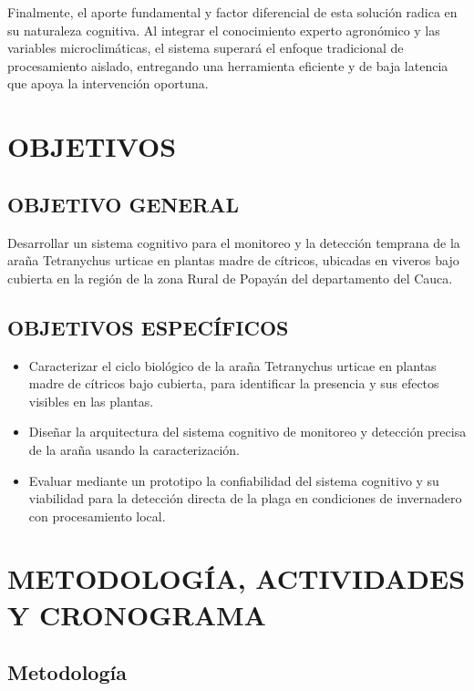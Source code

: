 \documentclass[12pt,letterpaper]{article}
\begin{document}
Finalmente, el aporte fundamental y factor diferencial de esta solución radica en su naturaleza cognitiva. Al integrar el conocimiento experto agronómico y las variables microclimáticas, el sistema superará el enfoque tradicional de procesamiento aislado, entregando una herramienta eficiente y de baja latencia que apoya la intervención oportuna.

\section{OBJETIVOS}

\subsection{OBJETIVO GENERAL}

Desarrollar un sistema cognitivo para el monitoreo y la detección temprana de la araña Tetranychus urticae en plantas madre de cítricos, ubicadas en viveros bajo cubierta en la región de la zona Rural de Popayán del 
departamento del Cauca. 

\subsection{OBJETIVOS ESPECÍFICOS}

\begin{itemize}
    \item Caracterizar el ciclo biológico de la araña Tetranychus urticae en plantas madre de cítricos bajo cubierta, para identificar la presencia y sus efectos visibles en las plantas.
    \item Diseñar la arquitectura del sistema cognitivo de monitoreo y detección precisa de la
araña usando la caracterización.
    \item Evaluar mediante un prototipo la confiabilidad del sistema cognitivo y su viabilidad para la detección directa de la plaga en condiciones de invernadero con procesamiento local.
\end{itemize}


\section{METODOLOGÍA, ACTIVIDADES Y CRONOGRAMA}

\subsection{Metodología}
\end{document}
